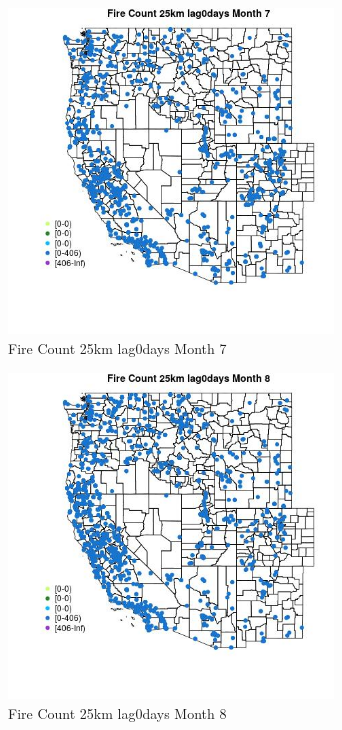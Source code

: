 \begin{figure} 
\centering  
\includegraphics[width=0.77\textwidth]{Code_Outputs/Report_ML_input_PM25_Step4_part_f_de_duplicated_aves_prioritize_24hr_obswNAs_MapObsMo7Fire_Count_25km_lag0days.jpg} 
\caption{\label{fig:Report_ML_input_PM25_Step4_part_f_de_duplicated_aves_prioritize_24hr_obswNAsMapObsMo7Fire_Count_25km_lag0days}Fire Count 25km lag0days Month 7} 
\end{figure} 
 

\clearpage 

\begin{figure} 
\centering  
\includegraphics[width=0.77\textwidth]{Code_Outputs/Report_ML_input_PM25_Step4_part_f_de_duplicated_aves_prioritize_24hr_obswNAs_MapObsMo8Fire_Count_25km_lag0days.jpg} 
\caption{\label{fig:Report_ML_input_PM25_Step4_part_f_de_duplicated_aves_prioritize_24hr_obswNAsMapObsMo8Fire_Count_25km_lag0days}Fire Count 25km lag0days Month 8} 
\end{figure} 
 


